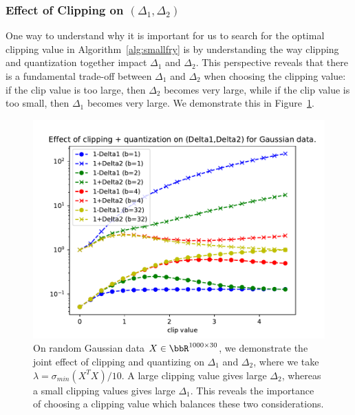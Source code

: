 \subsubsection{Effect of Clipping on $(\Delta_1,\Delta_2)$}
\label{sec:theory_clipping}
One way to understand why it is important for us to search for the optimal clipping value in Algorithm~\ref{alg:smallfry} is by understanding the way clipping and quantization together impact $\Delta_1$ and $\Delta_2$.
This perspective reveals that there is a fundamental trade-off between $\Delta_1$ and $\Delta_2$ when choosing the clipping value:
if the clip value is too large, then $\Delta_2$ becomes very large, while if the clip value is too small, then $\Delta_1$ becomes very large.
We demonstrate this in Figure~\ref{fig:deltas_vs_clip_quant}.
\begin{figure}
	\begin{center}
		\centerline{\includegraphics[width=0.8\columnwidth]{figures/deltas_vs_clip_and_quant.pdf}}
		\caption{On random Gaussian data $X \in \RR^{1000\times 30}$, we demonstrate the joint effect of clipping and quantizing on $\Delta_1$ and $\Delta_2$, where we take $\lambda = \sigma_{min}(X^T X)/10$.
		A large clipping value gives large $\Delta_2$, whereas a small clipping values gives large $\Delta_1$.
		This reveals the importance of choosing a clipping value which balances these two considerations.
		}
		\label{fig:deltas_vs_clip_quant}
	\end{center}
\end{figure}


